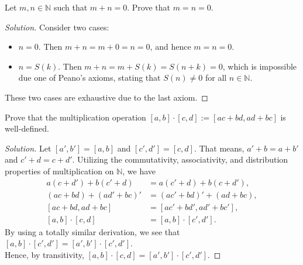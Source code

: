 \begin{problem}
    Let $m,n \in \mathbb{N}$ such that $m + n = 0$. Prove that $m = n = 0$.
\end{problem}
\begin{proof}[Solution]
    Consider two cases:
    \begin{itemize}
        \item $n = 0$. Then $m + n = m + 0 = n = 0$, and hence $m = n = 0$.
        \item $n = S(k)$. Then $m + n = m + S(k) = S(n + k) = 0$, which is impossible due one of Peano's axioms, stating that $S(n) \ne 0$ for all $n \in \mathbb{N}$.
    \end{itemize}
    These two cases are exhaustive due to the last axiom.
\end{proof}

\begin{problem}
    Prove that the multiplication operation $[a,b] \cdot [c,d] := [ac+bd, ad+bc]$ is well-defined.
\end{problem}
\begin{proof}[Solution]
    Let $[a',b'] = [a,b]$ and $[c',d'] = [c,d]$. That means, $a' + b = a + b'$ and $c' + d = c + d'$.
    Utilizing the commutativity, associativity, and distribution properties of multiplication on $\mathbb{N}$, we have
    \begin{align*}
        a(c + d') + b(c' + d) &= a(c' + d) + b(c + d'),\\
        (ac + bd) + (ad' + bc)' &= (ac' + bd)' + (ad + bc),\\
        [ac + bd, ad + bc] &= [ac' + bd', ad' + bc'],\\
        [a,b] \cdot [c,d] &= [a,b] \cdot [c',d'].
    \end{align*}
    By using a totally similar derivation, we see that $[a,b] \cdot [c',d'] = [a',b'] \cdot [c',d']$.\\
    Hence, by transitivity, $[a,b] \cdot [c,d] = [a',b'] \cdot [c',d']$.
\end{proof}

